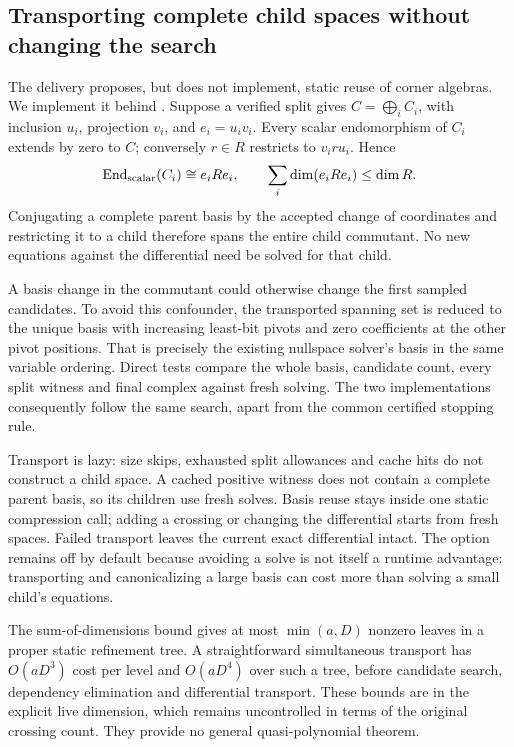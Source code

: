 \subsection{Transporting complete child spaces without changing the search}
The delivery proposes, but does not implement, static reuse of corner algebras.
We implement it behind . Suppose a verified
split gives $C=\bigoplus_i C_i$, with inclusion $u_i$, projection $v_i$, and
$e_i=u_iv_i$. Every scalar endomorphism of $C_i$ extends by zero to $C$;
conversely $r\in R$ restricts to $v_i r u_i$. Hence
\[
 \operatorname{End}_{\rm scalar}(C_i)\cong e_i R e_i,
 \qquad \sum_i\dim(e_iRe_i)\le\dim R.
\]
Conjugating a complete parent basis by the accepted change of coordinates and
restricting it to a child therefore spans the entire child commutant.
No new equations against the differential need be solved for that child.

A basis change in the commutant could otherwise change the first sampled
candidates. To avoid this confounder, the transported spanning set is reduced
to the unique basis with increasing least-bit pivots and zero coefficients
at the other pivot positions. That is precisely the existing nullspace
solver's basis in the same variable ordering. Direct tests compare the whole
basis, candidate count, every split witness and final complex against fresh
solving. The two implementations consequently follow the same search, apart
from the common certified stopping rule.

Transport is lazy: size skips, exhausted split allowances and cache hits do
not construct a child space. A cached positive witness does not contain a
complete parent basis, so its children use fresh solves. Basis reuse stays
inside one static compression call; adding a crossing or changing the
differential starts from fresh spaces. Failed transport leaves the current
exact differential intact. The option remains off by default because avoiding
a solve is not itself a runtime advantage: transporting and canonicalizing a
large basis can cost more than solving a small child's equations.

The sum-of-dimensions bound gives at most $\min(a,D)$ nonzero leaves in a
proper static refinement tree. A straightforward simultaneous transport has
$O(aD^3)$ cost per level and $O(aD^4)$ over such a tree, before candidate
search, dependency elimination and differential transport. These bounds are
in the explicit live dimension, which remains uncontrolled in terms of the
original crossing count. They provide no general quasi-polynomial theorem.

